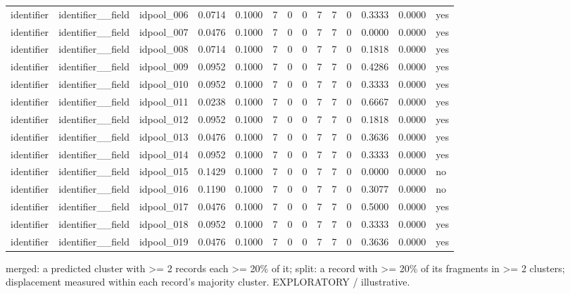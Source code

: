\begin{table}[t]
{\begin{tabular}{llllllllllllll}
identifier & identifier\_\_field & idpool\_006 & 0.0714 & 0.1000 & 7 & 0 & 0 & 7 & 7 & 0 & 0.3333 & 0.0000 & yes \\
identifier & identifier\_\_field & idpool\_007 & 0.0476 & 0.1000 & 7 & 0 & 0 & 7 & 7 & 0 & 0.0000 & 0.0000 & yes \\
identifier & identifier\_\_field & idpool\_008 & 0.0714 & 0.1000 & 7 & 0 & 0 & 7 & 7 & 0 & 0.1818 & 0.0000 & yes \\
identifier & identifier\_\_field & idpool\_009 & 0.0952 & 0.1000 & 7 & 0 & 0 & 7 & 7 & 0 & 0.4286 & 0.0000 & yes \\
identifier & identifier\_\_field & idpool\_010 & 0.0952 & 0.1000 & 7 & 0 & 0 & 7 & 7 & 0 & 0.3333 & 0.0000 & yes \\
identifier & identifier\_\_field & idpool\_011 & 0.0238 & 0.1000 & 7 & 0 & 0 & 7 & 7 & 0 & 0.6667 & 0.0000 & yes \\
identifier & identifier\_\_field & idpool\_012 & 0.0952 & 0.1000 & 7 & 0 & 0 & 7 & 7 & 0 & 0.1818 & 0.0000 & yes \\
identifier & identifier\_\_field & idpool\_013 & 0.0476 & 0.1000 & 7 & 0 & 0 & 7 & 7 & 0 & 0.3636 & 0.0000 & yes \\
identifier & identifier\_\_field & idpool\_014 & 0.0952 & 0.1000 & 7 & 0 & 0 & 7 & 7 & 0 & 0.3333 & 0.0000 & yes \\
identifier & identifier\_\_field & idpool\_015 & 0.1429 & 0.1000 & 7 & 0 & 0 & 7 & 7 & 0 & 0.0000 & 0.0000 & no \\
identifier & identifier\_\_field & idpool\_016 & 0.1190 & 0.1000 & 7 & 0 & 0 & 7 & 7 & 0 & 0.3077 & 0.0000 & no \\
identifier & identifier\_\_field & idpool\_017 & 0.0476 & 0.1000 & 7 & 0 & 0 & 7 & 7 & 0 & 0.5000 & 0.0000 & yes \\
identifier & identifier\_\_field & idpool\_018 & 0.0952 & 0.1000 & 7 & 0 & 0 & 7 & 7 & 0 & 0.3333 & 0.0000 & yes \\
identifier & identifier\_\_field & idpool\_019 & 0.0476 & 0.1000 & 7 & 0 & 0 & 7 & 7 & 0 & 0.3636 & 0.0000 & yes \\
\bottomrule
\end{tabular}}
\par\smallskip\parbox{\linewidth}{\tiny merged: a predicted cluster with >= 2 records each >= 20\% of it; split: a record with >= 20\% of its fragments in >= 2 clusters; displacement measured within each record's majority cluster. EXPLORATORY / illustrative.}
\end{table}
